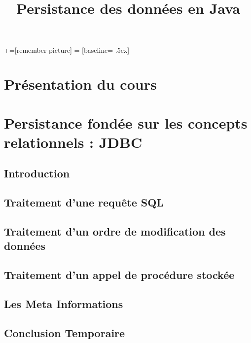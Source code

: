 \documentclass[xcolor=pdftex,x11names,table]{beamer}
\title[Persistance des données]{Persistance des données en Java}
\date{}
\begin{document}

  +=[remember picture]
   = [baseline=-.5ex]

  \begin{frame}
  \titlepage
  \end{frame}
  \section{Présentation du cours}

  \section{Persistance fondée sur les concepts relationnels : JDBC}
  	\subsection{Introduction}
    \subsection{Traitement d’une requête SQL}
		\subsection{Traitement d’un ordre de modification des données}
		\subsection{Traitement d’un appel de procédure stockée}
		\subsection{Les Meta Informations}
		\subsection{Conclusion Temporaire}
    
\end{document}
